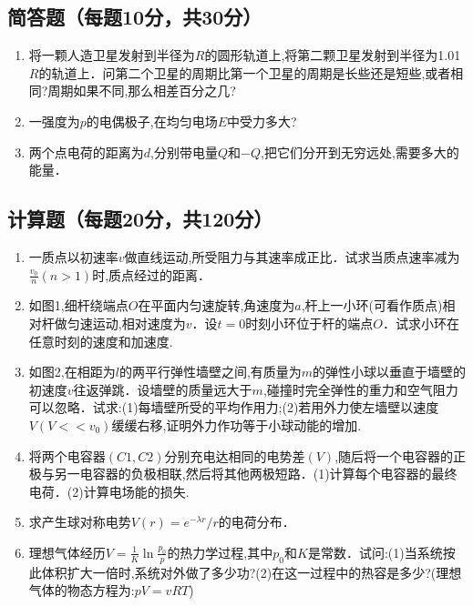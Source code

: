 
\subsection{ 简答题（每题10分，共30分）}
\begin{enumerate}
\item 将一颗人造卫星发射到半径为$R$的圆形轨道上,将第二颗卫星发射到半径为1.01$R$的轨道上．问第二个卫星的周期比第一个卫星的周期是长些还是短些,或者相同?周期如果不同,那么相差百分之几?
\item 一强度为$p$的电偶极子,在均匀电场$E$中受力多大?
\item 两个点电荷的距离为$d$,分别带电量$Q$和$-Q$,把它们分开到无穷远处,需要多大的能量．
\end{enumerate}
\subsection{计算题（每题20分，共120分）}
\begin{enumerate}
\item 一质点以初速率$v$做直线运动,所受阻力与其速率成正比．试求当质点速率减为$\frac{v_0}{n}(n>1)$时,质点经过的距离．
\item 如图1,细杆绕端点$O$在平面内匀速旋转,角速度为$a$,杆上一小环(可看作质点)相对杆做匀速运动,相对速度为$v$．设$t=0$时刻小环位于杆的端点$O$．试求小环在任意时刻的速度和加速度.
\item 如图2,在相距为$l$的两平行弹性墙壁之间,有质量为$m$的弹性小球以垂直于墙壁的初速度$v$往返弹跳．设墙壁的质量远大于$m$,碰撞时完全弹性的重力和空气阻力可以忽略．试求:(1)每墙壁所受的平均作用力;(2)若用外力使左墙壁以速度$V(V<<v_0)$缓缓右移,证明外力作功等于小球动能的增加.
\item 将两个电容器$(C1,C2)$分别充电达相同的电势差$(V)$,随后将一个电容器的正极与另一电容器的负极相联,然后将其他两极短路．(1)计算每个电容器的最终电荷．(2)计算电场能的损失.
\item 求产生球对称电势$V(r)=e^{-\lambda r}/r$的电荷分布．
\item 理想气体经历$V=\frac{1}{K} \ln \frac{p_{0}}{p}$的热力学过程,其中$p_0$和$K$是常数．试问:(1)当系统按此体积扩大一倍时,系统对外做了多少功?(2)在这一过程中的热容是多少?(理想气体的物态方程为:$pV=vRT$)
\end{enumerate}
